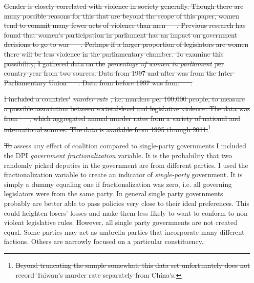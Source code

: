 \documentclass[a4paper]{article}\usepackage[]{graphicx}\usepackage[]{color}
\providecommand{\DIFdeltex}[1]{{\protect\color{red}\sout{#1}}}                      %
\providecommand{\DIFdelend}{} %
\providecommand{\DIFdel}[1]{\texorpdfstring{\DIFdeltex{#1}}{}} %
\begin{document}
\DIFdel{Gender is closely correlated with violence in society generally. Though there are many possible reasons for this that are beyond the scope of this paper, women tend to commit many fewer acts of violence than men \mbox{%
\citep[see][]{Schwartz2009}
}%
. Previous research has found that women's participation in parliament has an impact on government decisions to go to war \mbox{%
\citep{Melander2005}
}%
. Perhaps if a larger proportion of legislators are women there will be less violence in the parliamentary chamber. To examine this possibility, I gathered data on the }\emph{\DIFdel{percentage of women in parliament}} %
\DIFdel{per country-year from two sources. Data from 1997 and after was from the Inter-Parliamentary Union \mbox{%
\citeyearpar{IPU2013}
}%
. Data from before 1997 was from \mbox{%
\cite{Schwartz2009}
}%
.
}%

\DIFdel{I included a countries' }\emph{\DIFdel{murder rate}}%
\DIFdel{, i.e. murders per 100,000 people, to measure a possible association between societal-level and legislative violence. The data was from \mbox{%
\cite{UNMurder2013}
}%
, which aggregated annual murder rates from a variety of national and international sources. The data is available from 1995 through 2011.}\footnote{\DIFdel{Beyond truncating the sample somewhat, this data set unfortunately does not record Taiwan's murder rate separately from China's.}}
\addtocounter{footnote}{-1}%

\DIFdel{To }\DIFdelend assess any effect of coalition compared to single-party governments I included the DPI {\emph{government fractionalization}} variable. It is the probability that two randomly picked deputies in the government are from different parties. I used the fractionalization variable to create an indicator of {\emph{single-party}} government. It is simply a dummy equaling one if fractionalization was zero, i.e. all governing legislators were from the same party. In general single party governments probably are better able to pass policies very close to their ideal preferences. This could heighten losers' losses and make them less likely to want to conform to non-violent legislative rules. However, all single party governments are not created equal. Some parties may act as umbrella parties that incorporate many different factions. Others are narrowly focused on a particular constituency.
\end{document}
